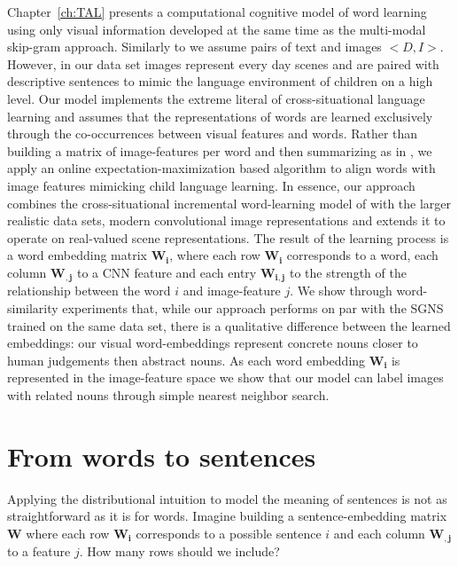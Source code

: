Chapter~\ref{ch:TAL} presents a computational cognitive model of word learning using only
visual information developed at the same time as the multi-modal skip-gram approach.
Similarly to \cite{feng2010visual} we assume pairs of text and images
$<D, I>$. However, in our data set images represent every day scenes and are paired with descriptive
sentences to mimic the language environment of children on a high level.
Our model implements the extreme literal of cross-situational language
learning and assumes that the representations of words are learned exclusively through the co-occurrences
between visual features and words. Rather than building a
matrix of image-features per word and then summarizing as in \cite{kiela2014learning},
we apply an online expectation-maximization based \citep{dempster1977maximum}
algorithm to align words with image features mimicking child language learning.
In essence, our approach combines the cross-situational incremental word-learning model
of \cite{fazly.etal.10csj} with the larger realistic data sets, modern convolutional image representations
and extends it to operate on real-valued scene representations.
The result of the learning process is a word embedding matrix $\mathbf{W_i}$,
where each row $\mathbf{W_i}$ corresponds to a word, each column $\mathbf{W_{,j}}$
to a CNN feature and each entry $\mathbf{W_{i,j}}$ to the strength
of the relationship between the word $i$ and image-feature $j$.
We show through word-similarity experiments that, while our approach performs on
par with the SGNS trained on the same data set, there is a qualitative difference between
the learned embeddings: our visual word-embeddings represent concrete nouns closer to human
judgements then abstract nouns. As each word embedding $\mathbf{W_i}$ is represented in the
image-feature space we show that our model can label images with related nouns through
simple nearest neighbor search.

\section{From words to sentences}
\label{sec:sentences}
Applying the distributional intuition to model the meaning of sentences is not as straightforward
as it is for words.
Imagine building a sentence-embedding matrix $\mathbf{W}$ where each row
$\mathbf{W_i}$ corresponds to
a possible sentence $i$ and each column $\mathbf{W_{,j}}$ to a feature $j$.
How many rows should we include?

